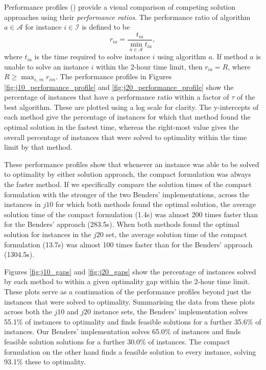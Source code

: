 \documentclass[a4paper,abstracton]{scrartcl}
\begin{document}
Performance profiles (\cite{dolan2002benchmarking}) provide a visual comparison of competing solution approaches using their \textit{performance ratios}. The performance ratio of algorithm $a\in \mathcal{A}$ for instance $i\in \mathcal{I}$ is defined to be 
$$r_{ia}=\frac{t_{ia}}{\min_{a\in \mathcal{A}} t_{ia}},$$
where $t_{ia}$ is the time required to solve instance $i$ using algorithm $a$. If method $a$ is unable to solve an instance $i$ within the 2-hour time limit, then $r_{ia}=R$, where $R\geq \max_{i,\,m}r_{im}$. The performance profiles in Figures \ref{fig:j10_performance_profile} and \ref{fig:j20_performance_profile} show the percentage of instances that have a performance ratio within a factor of $\tau$ of the best algorithm. These are plotted using a log scale for clarity. The y-intercepts of each method give the percentage of instances for which that method found the optimal solution in the fastest time, whereas the right-most value gives the overall percentage of instances that were solved to optimality within the time limit by that method.

These performance profiles show that whenever an instance was able to be solved to optimality by either solution approach, the compact formulation was always the faster method. If we specifically compare the solution times of the compact formulation with the stronger of the two Benders' implementations, across the instances in $j10$ for which both methods found the optimal solution, the average solution time of the compact formulation (1.4s) was almost 200 times faster than for the Benders' approach (283.5s). When both methods found the optimal solution for instances in the $j20$ set, the average solution time of the compact formulation (13.7s) was almost 100 times faster than for the Benders' approach (1304.5s). 

Figures \ref{fig:j10_gaps} and \ref{fig:j20_gaps} show the percentage of instances solved by each method to within a given optimality gap within the 2-hour time limit. These plots serve as a continuation of the performance profiles beyond just the instances that were solved to optimality. Summarising the data from these plots across both the $j10$ and $j20$ instance sets, the \cite{balouka2021robust} Benders' implementation solves 55.1\% of instances to optimality and finds feasible solutions for a further 35.6\% of instances. Our Benders' implementation solves 65.0\% of instances and finds feasible solution solutions for a further 30.0\% of instances. The compact formulation on the other hand finds a feasible solution to every instance, solving 93.1\% these to optimality.
\end{document}
